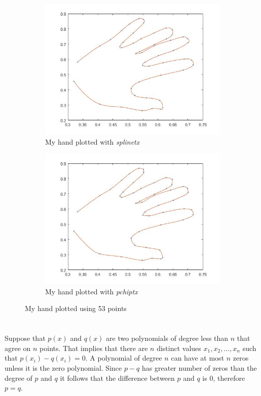 \documentclass[12pt]{article}
\begin{document}
\begin{figure}[t!]
    \begin{subfigure}[t]{0.5\textwidth}
        \centering
        \includegraphics[width=\linewidth]{hand1}
        \caption{My hand plotted with \textit{splinetx}}
        \label{fig_hand1}
    \end{subfigure}
    \begin{subfigure}[t]{0.5\textwidth}
        \centering
        \includegraphics[width=\linewidth]{hand2}
        \caption{My hand plotted with \textit{pchiptx}}
        \label{fig_hand2}
    \end{subfigure}
    \caption{My hand plotted using 53 points}
    \label{fig_hand}
\end{figure}

\section{} %

Suppose that $p(x)$ and $q(x)$ are two polynomials of degree less than $n$ that agree on $n$ points. That implies that there are $n$ distinct values $x_1, x_2, \dots , x_n$ such that $p(x_i) - q(x_i) = 0$. A polynomial of degree $n$ can have at most $n$ zeros unless it is the zero polynomial. Since $p - q$ has greater number of zeros than the degree of $p$ and $q$ it follows that the difference between $p$ and $q$ is $0$, therefore $p = q$.
\end{document}
